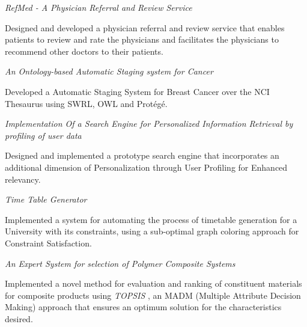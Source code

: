 \documentclass[10pt]{article}
\newcommand{\spc}{\vspace{1.2mm}}
\begin{document}
\textit{RefMed - A Physician Referral and Review Service}
\begin{compactitem}
\item {Designed and developed a physician referral and review service that enables patients to review and rate the physicians and facilitates the physicians to recommend other doctors to their patients.}
\end{compactitem}
\spc
\textit{An Ontology-based Automatic Staging system for Cancer}
\begin{compactitem}
\item {Developed a Automatic Staging System for Breast Cancer over the NCI Thesaurus using SWRL, OWL and Prot\'{e}g\'{e}}.
\end{compactitem}
\spc
\textit{Implementation Of a Search Engine for Personalized Information Retrieval by profiling of user data}
\begin{compactitem}
\item Designed and implemented  a prototype search engine that incorporates an additional dimension of Personalization through User Profiling for Enhanced relevancy.
\end{compactitem}
\spc
\textit{Time Table Generator}
\begin{compactitem}
\item Implemented a system for automating the process of timetable generation for a University with its constraints, using a sub-optimal graph coloring approach for Constraint Satisfaction.
\end{compactitem}
\spc
\textit{An Expert System for selection of Polymer Composite Systems }
\begin{compactitem}
\item Implemented a novel method for evaluation and ranking of constituent materials for composite products using \emph{TOPSIS} , an MADM (Multiple Attribute Decision Making) approach that ensures an optimum solution for the characteristics desired.
\end{compactitem}
\end{document}

